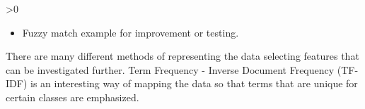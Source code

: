 \ifnum\printdraft>0
	\begin{itemize}
		\item Fuzzy match example for improvement or testing.
	\end{itemize}
\fi


There are many different methods of representing the data selecting features that can be investigated further. Term Frequency - Inverse Document Frequency (TF-IDF) is an interesting way of mapping the data so that terms that are unique for certain classes are emphasized.